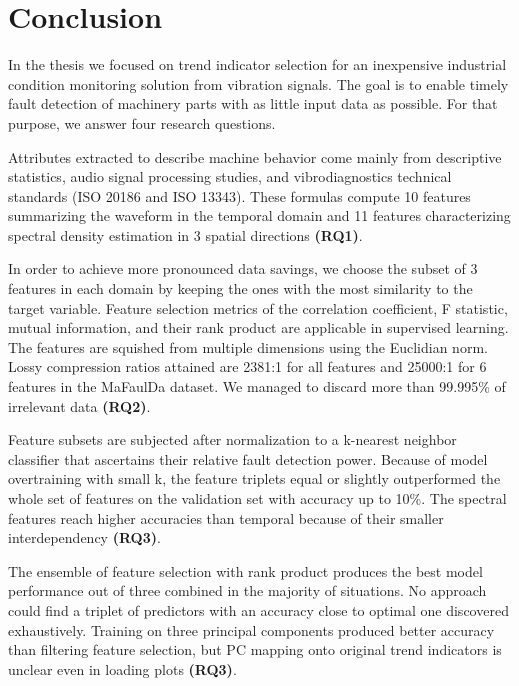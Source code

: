 \chapter{Conclusion} \label{section:conclusion}  

In the thesis we focused on trend indicator selection for an inexpensive industrial condition monitoring solution from vibration signals. The goal is to enable timely fault detection of machinery parts with as little input data as possible. For that purpose, we answer four research questions.

Attributes extracted to describe machine behavior come mainly from descriptive statistics, audio signal processing studies, and vibrodiagnostics technical standards (ISO 20186 and ISO 13343). These formulas compute 10 features summarizing the waveform in the temporal domain and 11 features characterizing spectral density estimation in 3 spatial directions \textbf{(RQ1)}.

In order to achieve more pronounced data savings, we choose the subset of 3 features in each domain by keeping the ones with the most similarity to the target variable. Feature selection metrics of the correlation coefficient, F statistic, mutual information, and their rank product are applicable in supervised learning. The features are squished from multiple dimensions using the Euclidian norm. Lossy compression ratios attained are 2381:1 for all features and 25000:1 for 6 features in the MaFaulDa dataset. We managed to discard more than 99.995\% of irrelevant data \textbf{(RQ2)}.

Feature subsets are subjected after normalization to a k-nearest neighbor classifier that ascertains their relative fault detection power. Because of model overtraining with small k, the feature triplets equal or slightly outperformed the whole set of features on the validation set with accuracy up to 10\%. The spectral features reach higher accuracies than temporal because of their smaller interdependency \textbf{(RQ3)}. 

The ensemble of feature selection with rank product produces the best model performance out of three combined in the majority of situations. No approach could find a triplet of predictors with an accuracy close to optimal one discovered exhaustively. Training on three principal components produced better accuracy than filtering feature selection, but PC mapping onto original trend indicators is unclear even in loading plots \textbf{(RQ3)}.

